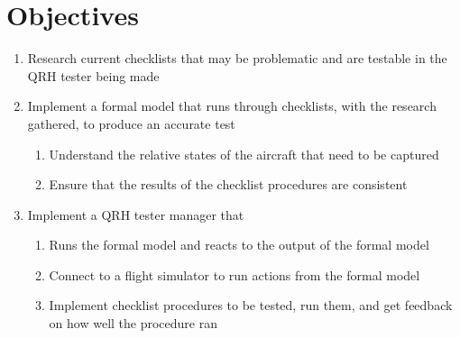 \documentclass[../dissertation.tex]{subfiles}
\begin{document}
\section{Objectives}
\begin{enumerate}
  \item Research current checklists that may be problematic and are testable
    in the QRH tester being made
  \item Implement a formal model that runs through checklists, with the
    research gathered, to produce an accurate test
    \begin{enumerate}
      \item Understand the relative states of the aircraft that need to be captured
      \item Ensure that the results of the checklist procedures are consistent
    \end{enumerate}
  \item Implement a QRH tester manager that
    \begin{enumerate}
      \item Runs the formal model and reacts to the output of the formal model
      \item Connect to a flight simulator to run actions from the formal model
      \item Implement checklist procedures to be tested, run them, and get
        feedback on how well the procedure ran
    \end{enumerate}
\end{enumerate}
\end{document}
